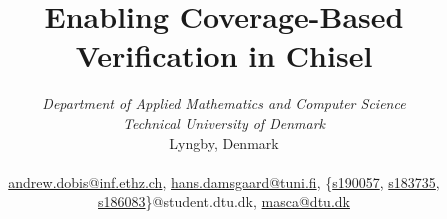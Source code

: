 \documentclass[a4paper]{IEEEtran}
\newcommand{\martin}[1]{{\color{blue} Martin: #1}}
\begin{document}
%
\title{Enabling Coverage-Based Verification in Chisel}
%

\author{
\IEEEauthorblockA\textit{Department of Applied Mathematics and Computer Science} \\
\textit{Technical University of Denmark}\\
Lyngby, Denmark \\\\
\href{mailto:andrew.dobis@inf.ethz.ch}{andrew.dobis@inf.ethz.ch}, \href{mailto:hans.damsgaard@tuni.fi}{hans.damsgaard@tuni.fi}, \{\href{mailto:s190057@student.dtu.dk}{s190057}, \href{mailto:s183735@student.dtu.dk}{s183735}, \href{mailto:s186083@student.dtu.dk}{s186083}\}@student.dtu.dk, \href{mailto:masca@dtu.dk}{masca@dtu.dk}
}


%
%
\maketitle              %
%
\end{document}
